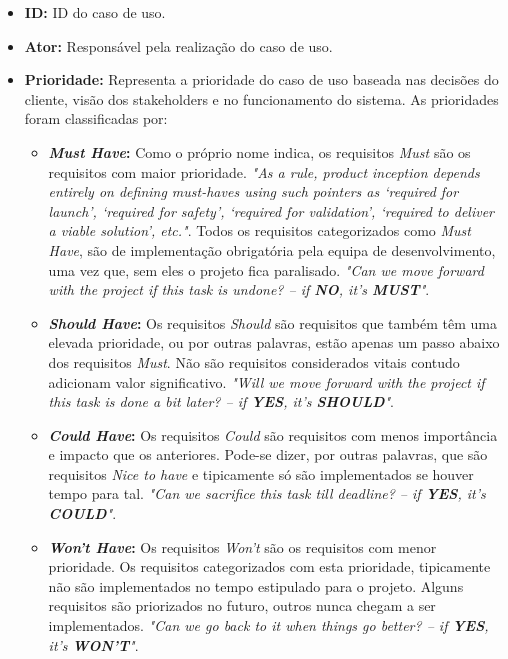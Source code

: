 \begin{itemize}
	\item \textbf{ID:} ID do caso de uso.
	\item \textbf{Ator:} Responsável pela realização do caso de uso.
	\item \textbf{Prioridade:} Representa a prioridade do caso de uso baseada nas decisões do cliente, visão dos stakeholders e no funcionamento do sistema. As prioridades foram classificadas por:
	\begin{itemize}
		\item \textbf{\textit{Must Have}:} Como o próprio nome indica, os requisitos \textit{Must} são os requisitos com maior prioridade. \textit{"As a rule, product inception depends entirely on defining must-haves using such pointers as ‘required for launch’, ‘required for safety’, ‘required for validation’, ‘required to deliver a viable solution’, etc."}\cite{railsware}. Todos os requisitos categorizados como \textit{Must Have}, são de implementação obrigatória pela equipa de desenvolvimento, uma vez que, sem eles o projeto fica paralisado.\textit{ "Can we move forward with the project if this task is undone? – if \textbf{NO}, it’s \textbf{MUST}"}\cite{railsware}.
		\item \textbf{\textit{Should Have}:} Os requisitos \textit{Should} são requisitos que também têm uma elevada prioridade, ou por outras palavras, estão apenas um passo abaixo dos requisitos \textit{Must}.
		Não são requisitos considerados vitais contudo adicionam valor significativo.\textit{ "Will we move forward with the project if this task is done a bit later? – if \textbf{YES}, it’s \textbf{SHOULD}"}\cite{railsware}.
		\item \textbf{\textit{Could Have}:} Os requisitos \textit{Could} são requisitos com menos importância e impacto que os anteriores. Pode-se dizer, por outras palavras, que são requisitos \textit{Nice to have} e tipicamente só são implementados se houver tempo para tal. \textit{ "Can we sacrifice this task till deadline? – if \textbf{YES}, it’s \textbf{COULD}"}\cite{railsware}.
		\item \textbf{\textit{Won't Have}:} Os requisitos \textit{Won't} são os requisitos com menor prioridade. Os requisitos categorizados com esta prioridade, tipicamente não são implementados no tempo estipulado para o projeto. Alguns requisitos são priorizados no futuro, outros nunca chegam a ser implementados. \textit{ "Can we go back to it when things go better? – if \textbf{YES}, it’s \textbf{WON’T}"}\cite{railsware}.
	\end{itemize}

\end{itemize}
